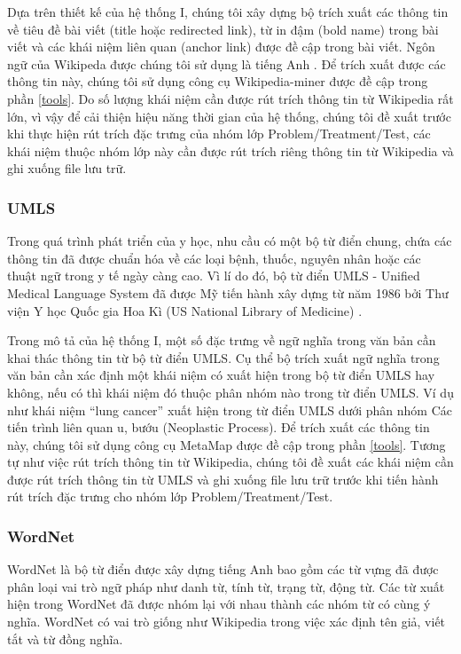Dựa trên thiết kế của hệ thống I, chúng tôi xây dựng bộ trích xuất các thông tin về tiêu đề bài viết (title hoặc redirected link), từ in đậm (bold name) trong bài viết và các khái niệm liên quan (anchor link) được đề cập trong bài viết. Ngôn ngữ của Wikipeda được chúng tôi sử dụng là tiếng Anh . Để trích xuất được các thông tin này, chúng tôi sử dụng công cụ Wikipedia-miner được đề cập trong phần \ref{tools}. Do số lượng khái niệm cần được rút trích thông tin từ Wikipedia rất lớn, vì vậy để cải thiện hiệu năng thời gian của hệ thống, chúng tôi đề xuất trước khi thực hiện rút trích đặc trưng của nhóm lớp Problem/Treatment/Test, các khái niệm thuộc nhóm lớp này cần được rút trích riêng thông tin từ Wikipedia và ghi xuống file lưu trữ.

\subsubsection*{UMLS}
Trong quá trình phát triển của y học, nhu cầu có một bộ từ điển chung, chứa các thông tin đã được chuẩn hóa về các loại bệnh, thuốc, nguyên nhân hoặc các thuật ngữ trong y tế ngày càng cao. Vì lí do đó, bộ từ điển UMLS - Unified Medical Language System đã được Mỹ tiến hành xây dựng từ năm 1986 bởi Thư viện Y học Quốc gia Hoa Kì (US National Library of Medicine) \cite{umlswiki}.

Trong mô tả của hệ thống I, một số đặc trưng về ngữ nghĩa trong văn bản cần khai thác thông tin từ bộ từ điển UMLS. Cụ thể bộ trích xuất ngữ nghĩa trong văn bản cần xác định một khái niệm có xuất hiện trong bộ từ điển UMLS hay không, nếu có thì khái niệm đó thuộc phân nhóm nào trong từ điển UMLS. Ví dụ như khái niệm ``lung cancer'' xuất hiện trong từ điển UMLS dưới phân nhóm Các tiến trình liên quan u, bướu (Neoplastic Process). Để trích xuất các thông tin này, chúng tôi sử dụng công cụ MetaMap được đề cập trong phần \ref{tools}. Tương tự như việc rút trích thông tin từ Wikipedia, chúng tôi đề xuất các khái niệm cần được rút trích thông tin từ UMLS và ghi xuống file lưu trữ trước khi tiến hành rút trích đặc trưng cho nhóm lớp Problem/Treatment/Test.

\subsubsection*{WordNet}
WordNet là bộ từ điển được xây dựng tiếng Anh bao gồm các từ vựng đã được phân loại vai trò ngữ pháp như danh từ, tính từ, trạng từ, động từ. Các từ xuất hiện trong WordNet đã được nhóm lại với nhau thành các nhóm từ có cùng ý nghĩa. WordNet có vai trò giống như Wikipedia trong việc xác định tên giả, viết tắt và từ đồng nghĩa.

